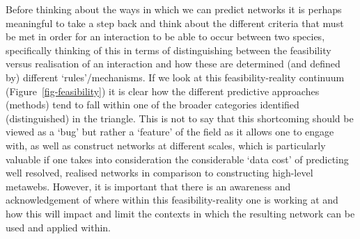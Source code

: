 \documentclass[
]{article}
\begin{document}
\begin{tcolorbox}[enhanced jigsaw, toprule=.15mm, title=\textcolor{quarto-callout-note-color}{\faInfo}\hspace{0.5em}{Box 1 - Moving between the feasibility and reality of interactions}, breakable, colback=white, leftrule=.75mm, left=2mm, bottomtitle=1mm, coltitle=black, titlerule=0mm, opacityback=0, bottomrule=.15mm, rightrule=.15mm, arc=.35mm, toptitle=1mm, opacitybacktitle=0.6, colframe=quarto-callout-note-color-frame, colbacktitle=quarto-callout-note-color!10!white]

Before thinking about the ways in which we can predict networks it is
perhaps meaningful to take a step back and think about the different
criteria that must be met in order for an interaction to be able to
occur between two species, specifically thinking of this in terms of
distinguishing between the feasibility versus realisation of an
interaction and how these are determined (and defined by) different
`rules'/mechanisms. If we look at this feasibility-reality continuum
(Figure~\ref{fig-feasibility}) it is clear how the different predictive
approaches (methods) tend to fall within one of the broader categories
identified (distinguished) in the triangle. This is not to say that this
shortcoming should be viewed as a `bug' but rather a `feature' of the
field as it allows one to engage with, as well as construct networks at
different scales, which is particularly valuable if one takes into
consideration the considerable `data cost' of predicting well resolved,
realised networks in comparison to constructing high-level metawebs.
However, it is important that there is an awareness and acknowledgement
of where within this feasibility-reality one is working at and how this
will impact and limit the contexts in which the resulting network can be
used and applied within.

\begin{figure}[H]

\centering{

}
\end{figure}
\end{tcolorbox}
\end{document}
